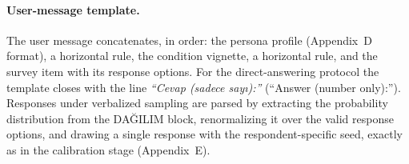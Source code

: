 \paragraph{User-message template.} The user message concatenates, in order:
the persona profile (Appendix~D format), a horizontal rule, the condition
vignette, a horizontal rule, and the survey item with its response options.
For the direct-answering protocol the template closes with the line
\emph{``Cevap (sadece sayı):''} (``Answer (number only):''). Responses under
verbalized sampling are parsed by extracting the probability distribution
from the DAĞILIM block, renormalizing it over the valid response options,
and drawing a single response with the respondent-specific seed, exactly as
in the calibration stage (Appendix~E).
